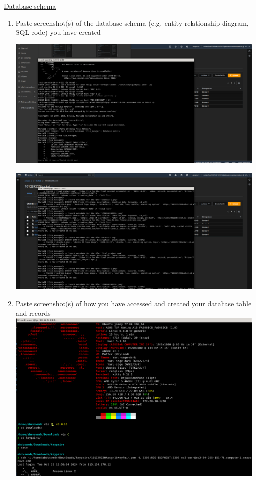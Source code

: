 \documentclass[11pt]{article}
\begin{document}
\noindent\underline{Database schema}
\begin{enumerate}[resume]
    \item Paste screenshot$($s$)$ of the database schema (e.g.\ entity relationship diagram, SQL code) you have created \\ 
    \vspace{5mm}

    {\centering
    \includegraphics[width=5.8in]{pics/36a.png}
    }

    {\centering
    \includegraphics[width=5.8in]{pics/36b.png}
    }



    \item Paste screenshot$($s$)$ of how you have accessed and created your database table and records \\
    

    {\centering
    \includegraphics[width=5.8in]{pics/37a.png}
    }




\end{enumerate}
\end{document}
